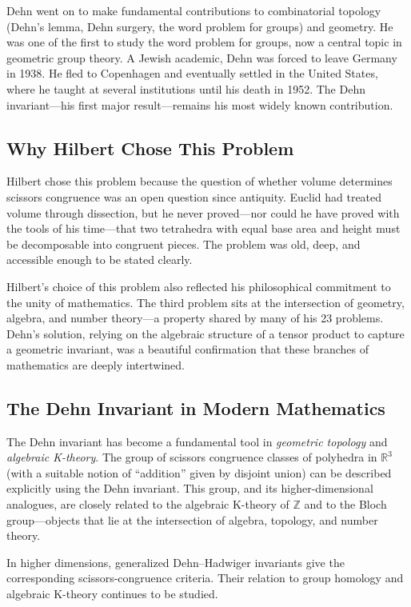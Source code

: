 Dehn went on to make fundamental contributions to combinatorial topology (Dehn's lemma, Dehn surgery, the word problem for groups) and geometry. He was one of the first to study the word problem for groups, now a central topic in geometric group theory. A Jewish academic, Dehn was forced to leave Germany in 1938. He fled to Copenhagen and eventually settled in the United States, where he taught at several institutions until his death in 1952. The Dehn invariant---his first major result---remains his most widely known contribution.

\subsection{Why Hilbert Chose This Problem}

Hilbert chose this problem because the question of whether volume determines scissors congruence was an open question since antiquity. Euclid had treated volume through dissection, but he never proved---nor could he have proved with the tools of his time---that two tetrahedra with equal base area and height must be decomposable into congruent pieces. The problem was old, deep, and accessible enough to be stated clearly.

Hilbert's choice of this problem also reflected his philosophical commitment to the unity of mathematics. The third problem sits at the intersection of geometry, algebra, and number theory---a property shared by many of his 23 problems. Dehn's solution, relying on the algebraic structure of a tensor product to capture a geometric invariant, was a beautiful confirmation that these branches of mathematics are deeply intertwined.

\subsection{The Dehn Invariant in Modern Mathematics}

The Dehn invariant has become a fundamental tool in \emph{geometric topology} and \emph{algebraic K-theory}. The group of scissors congruence classes of polyhedra in $\mathbb{R}^3$ (with a suitable notion of ``addition'' given by disjoint union) can be described explicitly using the Dehn invariant. This group, and its higher-dimensional analogues, are closely related to the algebraic K-theory of $\mathbb{Z}$ and to the Bloch group---objects that lie at the intersection of algebra, topology, and number theory.

In higher dimensions, generalized Dehn--Hadwiger invariants give the corresponding scissors-congruence criteria. Their relation to group homology and algebraic K-theory continues to be studied.

